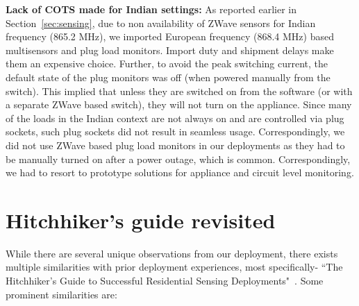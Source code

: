 \documentclass[10pt]{sensys-proc}
\newcommand{\secref}[1]{Section~\ref{#1}}
\begin{document}
\noindent \textbf{Lack of COTS made for Indian settings:} As reported earlier in \secref{sec:sensing}, due to non availability of ZWave sensors for Indian frequency (865.2 MHz), we imported European frequency (868.4 MHz) based multisensors and plug load monitors. Import duty and shipment delays make them an expensive choice. Further, to avoid the peak switching current, the default state of the plug monitors was off (when powered manually from the switch). This implied that unless they are switched on from the software (or with a separate ZWave based switch), they will not turn on the appliance. Since many of the loads in the Indian context are not always on and are controlled via plug sockets, such plug sockets did not result in seamless usage. Correspondingly, we did not use ZWave based plug load monitors in our deployments as they had to be manually turned on after a power outage, which is common. %
Correspondingly, we had to resort to prototype solutions for appliance and circuit level monitoring.

\section{Hitchhiker's guide revisited}
\label{sec:common}
While there are several unique observations from our deployment, there exists multiple similarities with prior deployment experiences, most specifically- ``The Hitchhiker's Guide to Successful Residential Sensing Deployments"~\cite{hitchhiker_residential}. Some prominent similarities are:
\end{document}
